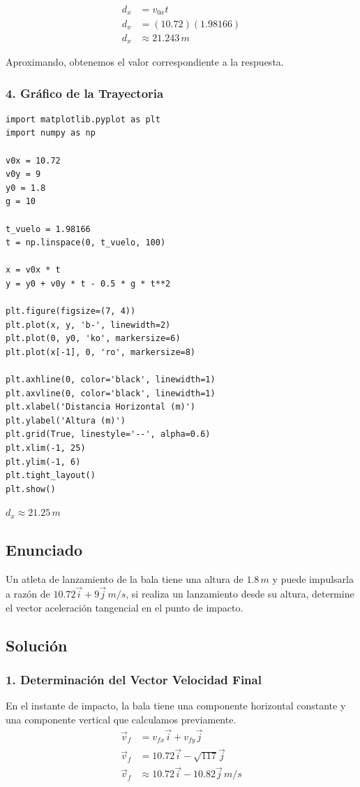 \documentclass[12pt, a4paper]{article}
\begin{document}
\begin{align*}
d_x &= v_{0x} t \\
d_x &= (10.72)(1.98166) \\
d_x &\approx 21.243 \, \si{m}
\end{align*}

Aproximando, obtenemos el valor correspondiente a la respuesta.

\subsubsection*{4. Gráfico de la Trayectoria}
\begin{verbatim}
import matplotlib.pyplot as plt
import numpy as np

v0x = 10.72
v0y = 9
y0 = 1.8
g = 10

t_vuelo = 1.98166
t = np.linspace(0, t_vuelo, 100)

x = v0x * t
y = y0 + v0y * t - 0.5 * g * t**2

plt.figure(figsize=(7, 4))
plt.plot(x, y, 'b-', linewidth=2)
plt.plot(0, y0, 'ko', markersize=6)
plt.plot(x[-1], 0, 'ro', markersize=8)

plt.axhline(0, color='black', linewidth=1)
plt.axvline(0, color='black', linewidth=1)
plt.xlabel('Distancia Horizontal (m)')
plt.ylabel('Altura (m)')
plt.grid(True, linestyle='--', alpha=0.6)
plt.xlim(-1, 25)
plt.ylim(-1, 6)
plt.tight_layout()
plt.show()
\end{verbatim}

\begin{tcolorbox}[colback=green!5!white, colframe=green!50!black, title=Respuesta Final]
\centering \Large $d_x \approx 21.25 \, \si{m}$
\end{tcolorbox}

\newpage

\subsection*{Enunciado}
Un atleta de lanzamiento de la bala tiene una altura de $1.8 \, \si{m}$ y puede impulsarla a razón de $10.72\vec{i} + 9\vec{j} \, \si{m/s}$, si realiza un lanzamiento desde su altura, determine el vector aceleración tangencial en el punto de impacto. 

\subsection*{Solución}

\subsubsection*{1. Determinación del Vector Velocidad Final}
En el instante de impacto, la bala tiene una componente horizontal constante y una componente vertical que calculamos previamente.
\begin{align*}
\vec{v}_f &= v_{fx}\vec{i} + v_{fy}\vec{j} \\
\vec{v}_f &= 10.72\vec{i} - \sqrt{117}\vec{j} \\
\vec{v}_f &\approx 10.72\vec{i} - 10.82\vec{j} \, \si{m/s}
\end{align*}
\end{document}

